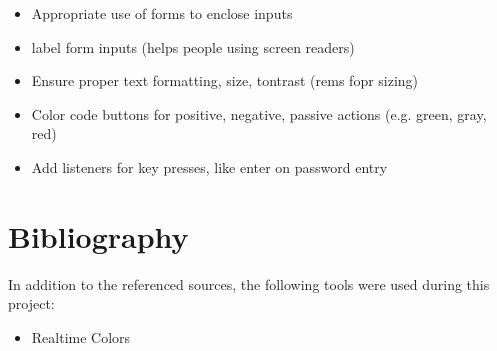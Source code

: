 \documentclass[12pt]{article}
\begin{document}
\begin{itemize}
\begin{itemize}
        \item Appropriate use of forms to enclose inputs
        \item label form inputs (helps people using screen readers)
        \item Ensure proper text formatting, size, tontrast (rems fopr sizing)
        \item Color code buttons for positive, negative, passive actions (e.g. green, gray, red)
        \item Add listeners for key presses, like enter on password entry
    \end{itemize}
\end{itemize}

%
%
%

\newpage
\section{Bibliography}

In addition to the referenced sources, the following tools were used during this project:

\begin{itemize}
    \item Realtime Colors \cite{rt-colors}
\end{itemize}



\end{document}
